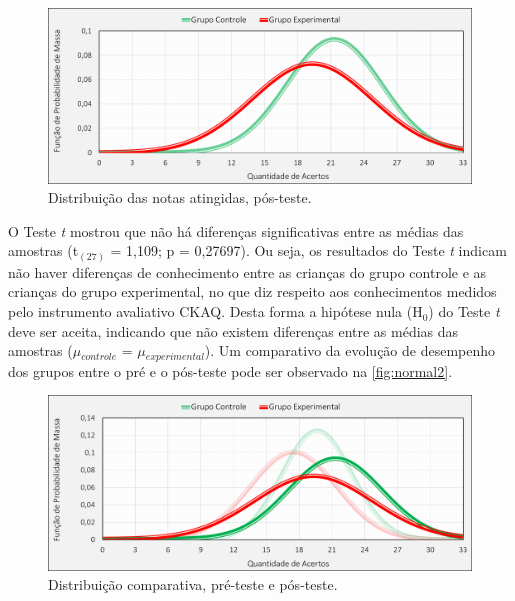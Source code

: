 \pagebreak

\begin{figure}[htb]
    \centering
    \caption{\label{fig:normal1}Distribuição das notas atingidas, pós-teste.}
    \includegraphics[width=\linewidth]{./Visuais/GraficosPosteste.pdf}
\end{figure}


O Teste \textit{t} mostrou que não há diferenças significativas entre as médias das amostras (t$_{(27)}$ = 1,109; p = 0,27697). Ou seja, os resultados do Teste \textit{t} indicam não haver diferenças de conhecimento entre as crianças do grupo controle e as crianças do grupo experimental, no que diz respeito aos conhecimentos medidos pelo instrumento avaliativo \ac{CKAQ}. Desta forma a hipótese nula (H$_0$) do Teste \textit{t} deve ser aceita, indicando que não existem diferenças entre as médias das amostras ($\mu$$_{controle}$ = $\mu$$_{experimental}$). %
Um comparativo da evolução de desempenho dos grupos entre o pré e o pós-teste pode ser observado na \autoref{fig:normal2}.

\begin{figure}[htb]
    \centering
    \caption{\label{fig:normal2}Distribuição comparativa, pré-teste e pós-teste.}
    \includegraphics[width=\linewidth]{./Visuais/GraficosAntesDepois.pdf}
\end{figure}

